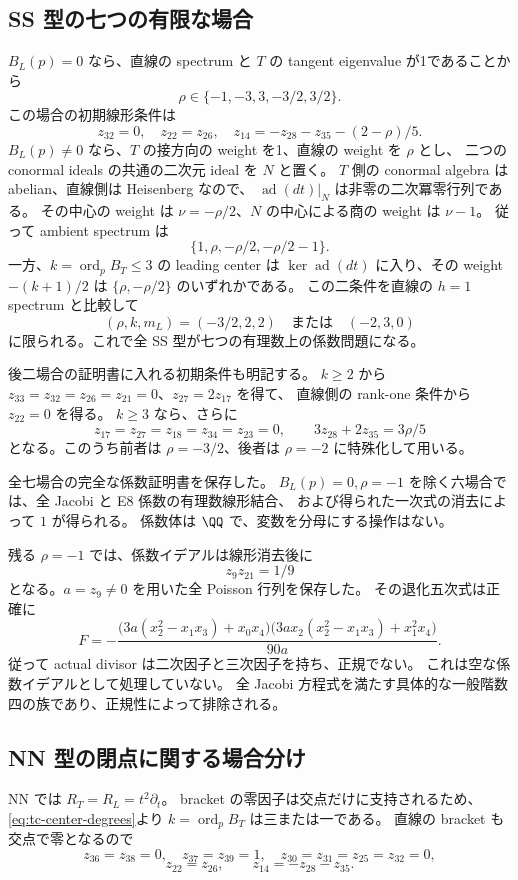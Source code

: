 \subsection{SS 型の七つの有限な場合}
$B_L(p)=0$ なら、直線の spectrum と $T$ の tangent eigenvalue が1であることから
\[
 \rho\in\{-1,-3,3,-3/2,3/2\}.
\]
この場合の初期線形条件は
\[
 z_{32}=0,\quad z_{22}=z_{26},\quad
 z_{14}=-z_{28}-z_{35}-(2-\rho)/5.
\]
$B_L(p)\ne0$ なら、$T$ の接方向の weight を1、直線の weight を $\rho$ とし、
二つの conormal ideals の共通の二次元 ideal を $N$ と置く。
$T$ 側の conormal algebra は abelian、直線側は Heisenberg なので、
$\operatorname{ad}(dt)|_N$ は非零の二次冪零行列である。
その中心の weight は $\nu=-\rho/2$、$N$ の中心による商の weight は $\nu-1$。
従って ambient spectrum は
\[
 \{1,\rho,-\rho/2,-\rho/2-1\}.
\]
一方、$k=\operatorname{ord}_p B_T\le3$ の leading center は
$\ker\operatorname{ad}(dt)$ に入り、その weight $-(k+1)/2$ は
$\{\rho,-\rho/2\}$ のいずれかである。
この二条件を直線の $h=1$ spectrum と比較して
\[
 (\rho,k,m_L)=(-3/2,2,2)\quad\text{または}\quad(-2,3,0)
\]
に限られる。これで全 SS 型が七つの有理数上の係数問題になる。

後二場合の証明書に入れる初期条件も明記する。
$k\ge2$ から $z_{33}=z_{32}=z_{26}=z_{21}=0$、$z_{27}=2z_{17}$ を得て、
直線側の rank-one 条件から $z_{22}=0$ を得る。
$k\ge3$ なら、さらに
\[
 z_{17}=z_{27}=z_{18}=z_{34}=z_{23}=0,\qquad
 3z_{28}+2z_{35}=3\rho/5
\]
となる。このうち前者は $\rho=-3/2$、後者は $\rho=-2$ に特殊化して用いる。

全七場合の完全な係数証明書を保存した。
$B_L(p)=0,\rho=-1$ を除く六場合では、全 Jacobi と E8 係数の有理数線形結合、
および得られた一次式の消去によって $1$ が得られる。
係数体は $\QQ$ で、変数を分母にする操作はない。

残る $\rho=-1$ では、係数イデアルは線形消去後に
\[
 z_9z_{21}=1/9
\]
となる。$a=z_9\ne0$ を用いた全 Poisson 行列を保存した。
その退化五次式は正確に
\begin{equation}\label{eq:ss-factor-family}
 F=-\frac{\bigl(3a(x_2^2-x_1x_3)+x_0x_4\bigr)
 \bigl(3a x_2(x_2^2-x_1x_3)+x_1^2x_4\bigr)}{90a}.
\end{equation}
従って actual divisor は二次因子と三次因子を持ち、正規でない。
これは空な係数イデアルとして処理していない。
全 Jacobi 方程式を満たす具体的な一般階数四の族であり、正規性によって排除される。

\subsection{NN 型の閉点に関する場合分け}
NN では $R_T=R_L=t^2\partial_t$。
bracket の零因子は交点だけに支持されるため、\eqref{eq:tc-center-degrees}より
$k=\operatorname{ord}_p B_T$ は三または一である。
直線の bracket も交点で零となるので
\[
 z_{36}=z_{38}=0,\quad z_{37}=z_{39}=1,\quad
 z_{30}=z_{31}=z_{25}=z_{32}=0,
\]
\[
 z_{22}=z_{26},\qquad z_{14}=-z_{28}-z_{35}.
\]

